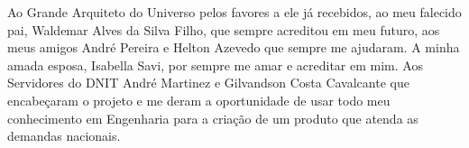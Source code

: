 \begin{agradecimentos}
Ao Grande Arquiteto do Universo pelos favores a ele já recebidos, ao meu falecido pai, Waldemar Alves da Silva Filho, que sempre acreditou em meu futuro, aos meus amigos André Pereira e Helton Azevedo que sempre me ajudaram. A minha amada esposa, Isabella Savi, por sempre me amar e acreditar em mim. Aos Servidores do DNIT André Martinez e Gilvandson Costa Cavalcante que encabeçaram o projeto e me deram a oportunidade de usar todo meu conhecimento em Engenharia para a criação de um produto que atenda as demandas nacionais.
\end{agradecimentos}
